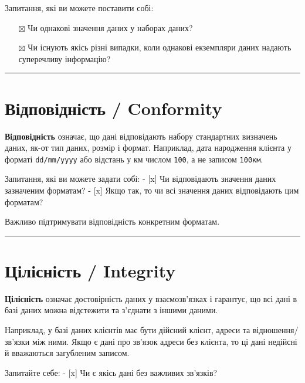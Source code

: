 \documentclass[
  letterpaper,
  DIV=11,
  numbers=noendperiod]{scrreprt}
\providecommand{\tightlist}{%
  \setlength{\itemsep}{0pt}\setlength{\parskip}{0pt}}\usepackage{longtable,booktabs,array}
\begin{document}
Запитання, які ви можете поставити собі:

\begin{itemize}
\tightlist
\item[$\boxtimes$]
  Чи однакові значення даних у наборах даних?
\item[$\boxtimes$]
  Чи існують якісь різні випадки, коли однакові екземпляри даних надають
  суперечливу інформацію?
\end{itemize}

\begin{center}\rule{0.5\linewidth}{0.5pt}\end{center}

\section{Відповідність /
Conformity}\label{ux432ux456ux434ux43fux43eux432ux456ux434ux43dux456ux441ux442ux44c-conformity}

\textbf{Відповідність} означає, що дані відповідають набору стандартних
визначень даних, як-от тип даних, розмір і формат. Наприклад, дата
народження клієнта у форматі \texttt{dd/mm/yyyy} або відстань у км
числом \texttt{100}, а не записом \texttt{100км}.

Запитання, які ви можете задати собі: - {[}x{]} Чи відповідають значення
даних зазначеним форматам? - {[}x{]} Якщо так, то чи всі значення даних
відповідають цим форматам?

Важливо підтримувати відповідність конкретним форматам.

\begin{center}\rule{0.5\linewidth}{0.5pt}\end{center}

\section{Цілісність /
Integrity}\label{ux446ux456ux43bux456ux441ux43dux456ux441ux442ux44c-integrity}

\textbf{Цілісність} означає достовірність даних у взаємозв'язках і
гарантує, що всі дані в базі даних можна відстежити та з'єднати з іншими
даними.

Наприклад, у базі даних клієнтів має бути дійсний клієнт, адреси та
відношення/зв'язки між ними. Якщо є дані про зв'язок адреси без клієнта,
то ці дані недійсні й вважаються загубленим записом.

Запитайте себе: - {[}x{]} Чи є якісь дані без важливих зв'язків?
\end{document}
